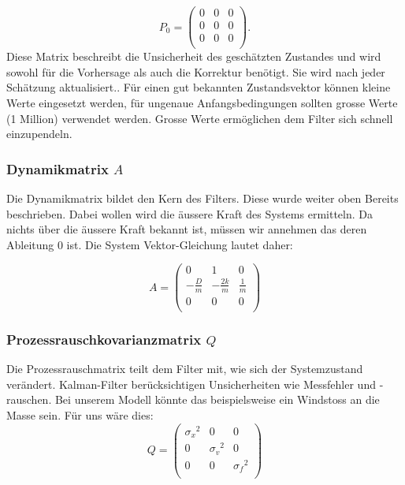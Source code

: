\documentclass[11pt,a4paper]{article}
\begin{document}
\begin{equation}
{P_0 }=
\left(
\begin{array}{ccc} 	
0 & 0 &0 \\ 
0 &0 & 0 \\ 
0 & 0 &0 \\
\end{array}
\right).
\end{equation}
Diese Matrix beschreibt die Unsicherheit des geschätzten Zustandes und wird sowohl für die Vorhersage als auch die Korrektur benötigt. Sie wird nach jeder Schätzung aktualisiert.. Für einen gut bekannten Zustandsvektor können kleine Werte eingesetzt werden, für ungenaue Anfangsbedingungen sollten grosse Werte (1 Million) verwendet werden. Grosse Werte ermöglichen dem Filter sich schnell einzupendeln. 


\subsubsection*{Dynamikmatrix $A$}
Die Dynamikmatrix bildet den Kern des Filters. Diese wurde weiter oben Bereits beschrieben. Dabei wollen wird die äussere Kraft des Systems ermitteln.
Da nichts über die äussere Kraft bekannt ist, müssen wir annehmen das deren Ableitung 0 ist.
Die System Vektor-Gleichung lautet daher:


\begin{equation}
A = \left(
 \begin{array}{ccc} 	
0 & 1& 0 \\
- \frac{D}{m} &-\frac{2k}{m} & \frac{1} {m}\\
0 & 0& 0\\ 
\end{array}\right)  
\end{equation} 

\subsubsection*{Prozessrauschkovarianzmatrix $Q$}
Die Prozessrauschmatrix teilt dem Filter mit, wie sich der Systemzustand verändert. Kalman-Filter berücksichtigen Unsicherheiten wie Messfehler und -rauschen. Bei unserem Modell könnte das beispielsweise ein Windstoss an die Masse sein. Für uns wäre dies:
\begin{equation}
Q = \left(
 \begin{array}{ccc} 	
{\sigma_x }^2& 0& 0 \\ 
0 & {\sigma_v }^2& 0\\ 
0 & 0& {\sigma_f }^2\\
\end{array}\right)  
\end{equation} 
\end{document}
